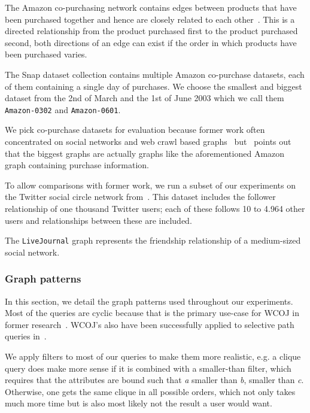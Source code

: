 The Amazon co-purchasing network contains edges between products that have been purchased together and hence are closely related to each other~\cite{snapnets}.
This is a directed relationship from the product purchased first to the product purchased second, both directions of an edge can exist if the order in which
products have been purchased varies.

The Snap dataset collection contains multiple Amazon co-purchase datasets, each of them containing a single day of purchases.
We choose the smallest and biggest dataset from the 2nd of March and the 1st of June 2003 which we call them \texttt{Amazon-0302} and
\texttt{Amazon-0601}.

We pick co-purchase datasets for evaluation because former work often concentrated on social networks and web crawl based
graphs~\cite{myria-detailed,ammar2018distributed} but~\cite{salihoglu2018} points out that the biggest graphs are actually graphs like
the aforementioned Amazon graph containing purchase information.

To allow comparisons with former work, we run a subset of our experiments on the Twitter social circle network from~\cite{snapnets}.
This dataset includes the follower relationship of one thousand Twitter users; each of these follows 10 to 4.964 other users and
relationships between these are included.

The \texttt{LiveJournal} graph represents the friendship relationship of a medium-sized social network.

\subsubsection{Graph patterns}

In this section, we detail the graph patterns used throughout our experiments.
Most of the queries are cyclic because that is the primary use-case for WCOJ in former research~\cite{olddog,myria-detailed}.
WCOJ's also have been successfully applied to selective path queries in~\cite{olddog,longbin}.

We apply filters to most of our queries to make them more realistic, e.g. a clique query does make more sense if it is combined with a
smaller-than filter, which requires that the attributes are bound such that \textit{a} smaller than \textit{b}, smaller than \textit{c}.
Otherwise, one gets the same clique in all possible orders, which not only takes much more time but is also most
likely not the result a user would want.

